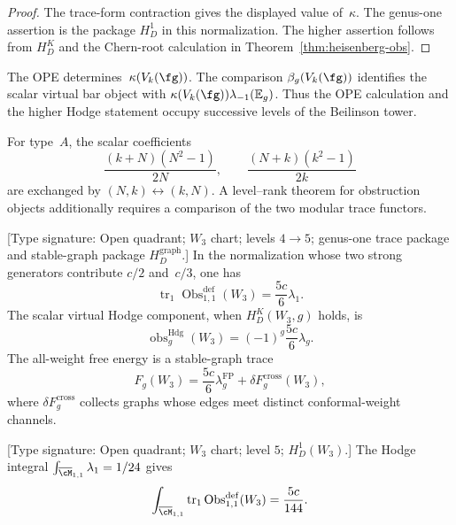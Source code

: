 \begin{proof}
The trace-form contraction gives the displayed value of~$\kappa$.
The genus-one assertion is the package $H_D^1$ in this normalization.
The higher assertion follows from $H_D^K$ and the Chern-root
calculation in Theorem~\ref{thm:heisenberg-obs}.
\end{proof}

\begin{remark}
\label{rem:kac-moody-obs-scope}
The OPE determines~$\kappa(V_k(\fg))$.  The comparison
$\beta_g(V_k(\fg))$ identifies the scalar virtual bar object with
$\kappa(V_k(\fg))\lambda_{-1}(\mathbb E_g)$.  Thus the OPE
calculation and the higher Hodge statement occupy successive levels
of the Beilinson tower.
\end{remark}

\begin{remark}
\label{rem:level-rank-obstruction}
For type~$A$, the scalar coefficients
\[
 \frac{(k+N)(N^2-1)}{2N},
 \qquad
 \frac{(N+k)(k^2-1)}{2k}
\]
are exchanged by $(N,k)\leftrightarrow(k,N)$.  A level--rank theorem
for obstruction objects additionally requires a comparison of the
two modular trace functors.
\end{remark}

\label{subsec:w-algebra-obstruction}
\begin{theorem}
\label{thm:w3-obstruction}
\textup{[Type signature: Open quadrant; $W_3$ chart; levels $4\to5$;
genus-one trace package and stable-graph package
$H_D^{\mathrm{graph}}$.]}
In the normalization whose two strong generators contribute
$c/2$ and~$c/3$, one has
\[
 \operatorname{tr}_1\operatorname{Obs}^{\mathrm{def}}_{1,1}(W_3)
 =\frac{5c}{6}\lambda_1.
\]
The scalar virtual Hodge component, when $H_D^K(W_3,g)$ holds, is
\[
 \operatorname{obs}^{\mathrm{Hdg}}_g(W_3)
 =(-1)^g\frac{5c}{6}\lambda_g.
\]
The all-weight free energy is a stable-graph trace
\[
 F_g(W_3)=\frac{5c}{6}\lambda_g^{\mathrm{FP}}
 +\delta F_g^{\mathrm{cross}}(W_3),
\]
where $\delta F_g^{\mathrm{cross}}$ collects graphs whose edges meet
distinct conformal-weight channels.
\end{theorem}

\begin{computation}
\label{comp:w3-obs-explicit}
\textup{[Type signature: Open quadrant; $W_3$ chart; level $5$;
$H_D^1(W_3)$.]}
The Hodge integral $\int_{\overline{\cM}_{1,1}}\lambda_1=1/24$
gives
\[
 \int_{\overline{\cM}_{1,1}}
 \operatorname{tr}_1\operatorname{Obs}^{\mathrm{def}}_{1,1}(W_3)
 =\frac{5c}{144}.
\]
\end{computation}

